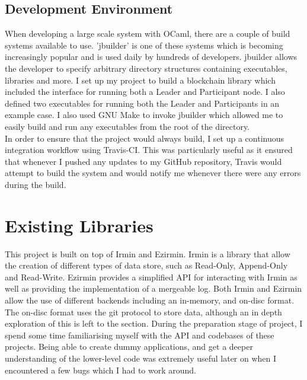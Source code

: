 \documentclass[12pt,a4paper,twoside,openright]{report}
\begin{document}
		\subsection*{Development Environment}
		When developing a large scale system with OCaml, there are a couple of build systems available to use. 
		'jbuilder' \cite{jbuilder} is one of these systems which is becoming increasingly popular and is used daily by hundreds of developers.
		jbuilder allows the developer to specify arbitrary directory structures containing executables, libraries and more.
		I set up my project to build a blockchain library which included the interface for running both a Leader and Participant node. 
		I also defined two executables for running both the Leader and Participants in an example case. 
		I also used GNU Make \cite{GNUMake} to invoke jbuilder which allowed me to easily build and run any executables from the root of the directory.\\
		
		In order to ensure that the project would always build, I set up a continuous integration workflow using Travis-CI. 
		This was particularly useful as it ensured that whenever I pushed any updates to my GitHub repository, Travis would attempt to build the system and would notify me whenever there were any errors during the build.

	\section{Existing Libraries}
		This project is built on top of Irmin and Ezirmin.
		Irmin is a library that allow the creation of different types of data store, such as Read-Only, Append-Only and Read-Write.
		Ezirmin provides a simplified API for interacting with Irmin as well as providing the implementation of a mergeable log.
		Both Irmin and Ezirmin allow the use of different backends including an in-memory, and on-disc format. 
		The on-disc format uses the git protocol to store data, although an in depth exploration of this is left to the  section.
		During the preparation stage of project, I spend some time familiarising myself with the API and codebases of these projects. 
		Being able to create dummy applications, and get a deeper understanding of the lower-level code was extremely useful later on when I encountered a few bugs which I had to work around.\\
\end{document}
